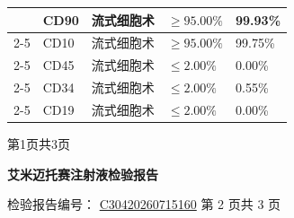 \documentclass[UTF8,10pt,a4paper,fontset=fandol]{ctexart}
\newcommand{\fieldvalue}[1]{#1}
\begin{document}
\begin{center}
\begin{tabular}{|p{1.55cm}|p{1.85cm}|p{2.45cm}|p{6.70cm}|p{3.55cm}|}
& CD90 &
\fieldvalue{流式细胞术}
&
\fieldvalue{$\geq95.00\%$}
&
\fieldvalue{99.93\%}
\\ \cline{2-5}
& CD10 &
\fieldvalue{流式细胞术}
&
\fieldvalue{$\geq95.00\%$}
&
\fieldvalue{99.75\%}
\\ \cline{2-5}
& CD45 &
\fieldvalue{流式细胞术}
&
\fieldvalue{$\leq2.00\%$}
&
\fieldvalue{0.00\%}
\\ \cline{2-5}
& CD34 &
\fieldvalue{流式细胞术}
&
\fieldvalue{$\leq2.00\%$}
&
\fieldvalue{0.55\%}
\\ \cline{2-5}
& CD19 &
\fieldvalue{流式细胞术}
&
\fieldvalue{$\leq2.00\%$}
&
\fieldvalue{0.00\%}
\\ \hline
\end{tabular}
\end{center}

\begin{center}
第1页共3页
\end{center}


\newpage

\begin{center}
\textbf{艾米迈托赛注射液检验报告}
\end{center}

检验报告编号：
\fieldvalue{\underline{C30420260715160}}
\quad 第 2 页共 3 页
\end{document}
